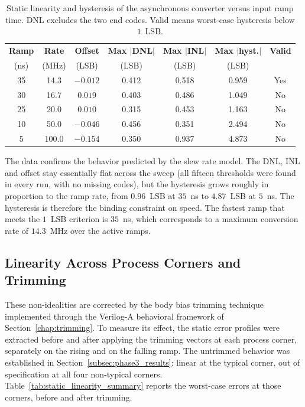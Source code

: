 \begin{table}[htbp]
    \centering
    \caption{Static linearity and hysteresis of the asynchronous converter versus input ramp time. DNL excludes the two end codes. Valid means worst-case hysteresis below $1$~LSB.}
    \label{tab:static_ramp}
    \renewcommand{\arraystretch}{1.3}
    \begin{tabular}{ccccccc}
        \toprule
        \textbf{Ramp} & \textbf{Rate} & \textbf{Offset} & \textbf{Max $|$DNL$|$} & \textbf{Max $|$INL$|$} & \textbf{Max $|$hyst.$|$} & \textbf{Valid} \\
        (ns) & (MHz) & (LSB) & (LSB) & (LSB) & (LSB) & \\
        \midrule
        35 & 14.3  & $-0.012$ & 0.412 & 0.518 & 0.959 & Yes \\
        30 & 16.7  & $0.019$  & 0.403 & 0.486 & 1.049 & No  \\
        25 & 20.0  & $0.010$  & 0.315 & 0.453 & 1.163 & No  \\
        10 & 50.0  & $-0.046$ & 0.456 & 0.351 & 2.494 & No  \\
        5  & 100.0 & $-0.154$ & 0.350 & 0.937 & 4.873 & No  \\
        \bottomrule
    \end{tabular}
\end{table}

The data confirms the behavior predicted by the slew rate model. The DNL, INL and offset stay essentially flat across the sweep (all fifteen thresholds were found in every run, with no missing codes), but the hysteresis grows roughly in proportion to the ramp rate, from $0.96$~LSB at $35$~ns to $4.87$~LSB at $5$~ns. The hysteresis is therefore the binding constraint on speed. The fastest ramp that meets the $1$~LSB criterion is $35$~ns, which corresponds to a maximum conversion rate of $14.3$~MHz over the active ramps.

\subsection{Linearity Across Process Corners and Trimming}

These non-idealities are corrected by the body bias trimming technique implemented through the Verilog-A behavioral framework of Section~\ref{chap:trimming}. To measure its effect, the static error profiles were extracted before and after applying the trimming vectors at each process corner, separately on the rising and on the falling ramp. The untrimmed behavior was established in Section~\ref{subsec:phase3_results}: linear at the typical corner, out of specification at all four non-typical corners. Table~\ref{tab:static_linearity_summary} reports the worst-case errors at those corners, before and after trimming.

